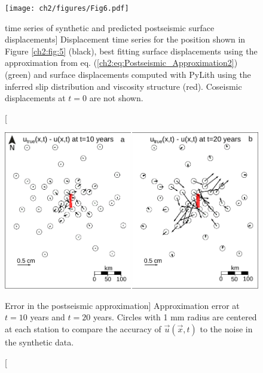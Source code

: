 \begin{figure}
\texttt{[image: ch2/figures/Fig6.pdf]}
\caption
[time series of synthetic and predicted postseismic surface
displacements]
{Displacement time series for the position shown in Figure
\ref{ch2:fig:5} (black), best fitting surface displacements using the
approximation from eq. (\ref{ch2:eq:Postseismic_Approximation2})
(green) and surface displacements computed with PyLith using the
inferred slip distribution and viscosity structure (red). Coseismic
displacements at $t=0$ are not shown.}
\label{ch2:fig:6}
\end{figure}

\begin{figure}
\includegraphics{ch2/figures/Fig7.pdf}
\caption
[Error in the postseismic approximation]
{Approximation error at $t=10$ years and $t=20$ years. Circles
with 1 mm radius are centered at each station to compare the accuracy
of $\vec{u}(\vec{x},t)$ to the noise in the synthetic data.}
\label{ch2:fig:7}
\end{figure}

